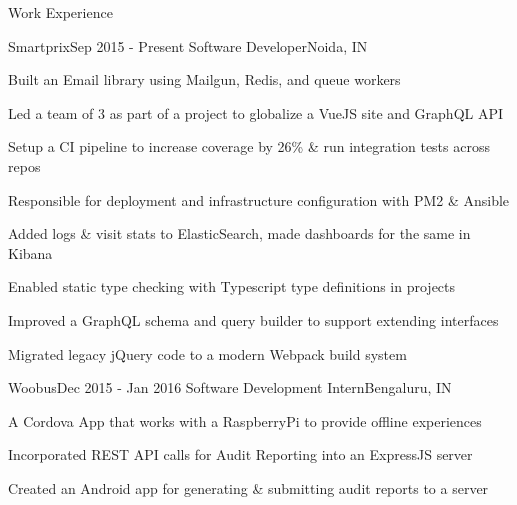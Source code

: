 \documentclass{resume} %
\begin{document}
\begin{rSection}{Work Experience}

    \begin{rSubsection}{Smartprix}{Sep 2015 - Present}
        {Software Developer}{Noida, IN}

        \item Built an Email library using Mailgun, Redis, and queue workers
        \item Led a team of 3 as part of a project to globalize a VueJS site and GraphQL API
        \item Setup a CI pipeline to increase coverage by 26\% \& run integration tests across repos
        \item Responsible for deployment and infrastructure configuration with PM2 \& Ansible 
        \item Added logs \& visit stats to ElasticSearch, made dashboards for the same in Kibana
        \item Enabled static type checking with Typescript type definitions in projects
        \item Improved a GraphQL schema and query builder to support extending interfaces
        \item Migrated legacy jQuery code to a modern Webpack build system
    \end{rSubsection}


    \begin{rSubsection}{Woobus}{Dec 2015 - Jan 2016}
        {Software Development Intern}{Bengaluru, IN}

        \item A Cordova App that works with a RaspberryPi to provide offline experiences
        \item Incorporated REST API calls for Audit Reporting into an ExpressJS server
        \item Created an Android app for generating \& submitting audit reports to a server
    \end{rSubsection}

\end{rSection}

\end{document}
